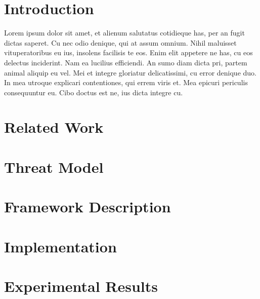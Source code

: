 \documentclass{acm_proc_article-sp}
\begin{document}
\maketitle
\begin{abstract}
This paper provides a sample of a \LaTeX\ document which conforms to
the formatting guidelines for ACM SIG Proceedings.
It complements the document \textit{Author's Guide to Preparing
ACM SIG Proceedings Using \LaTeX$2_\epsilon$\ and Bib\TeX}. This
source file has been written with the intention of being
compiled under \LaTeX$2_\epsilon$\ and BibTeX.

\end{abstract}

\section{Introduction}

Lorem ipsum dolor sit amet, et alienum salutatus cotidieque has, per an fugit dictas saperet. Cu nec odio denique, qui at assum omnium. Nihil maluisset vituperatoribus eu ius, insolens facilisis te eos. Enim elit appetere ne has, cu eos delectus inciderint. Nam ea lucilius efficiendi. An sumo diam dicta pri, partem animal aliquip eu vel. Mei et integre gloriatur delicatissimi, cu error denique duo. In mea utroque explicari contentiones, qui errem viris et. Mea epicuri periculis consequuntur eu. Cibo doctus est ne, ius dicta integre cu.


\section{Related Work}

\section{Threat Model}

\section{Framework Description}

\section{Implementation}

\section{Experimental Results}
\end{document}

